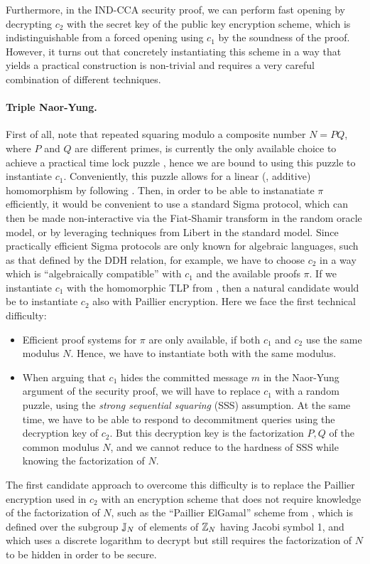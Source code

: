 Furthermore, in the IND-CCA security proof, we can perform fast opening by decrypting $c_2$ with the secret key of the public key encryption scheme, which is indistinguishable from a forced opening using $c_1$ by the soundness of the proof. 
%
However, it turns out that concretely instantiating this scheme in a way that yields a practical construction is non-trivial and requires a very careful combination of different techniques.

\paragraph{Triple Naor-Yung.}
First of all, note that repeated squaring modulo a composite number $N = PQ$, where $P$ and $Q$ are different primes, is currently the only available choice to achieve a practical time lock puzzle , hence we are bound to using this puzzle to instantiate $c_1$. Conveniently, this puzzle allows for a linear (\ie, additive) homomorphism by following \cite{C:MalThy19}.
%
Then, in order to be able to instanatiate $\pi$ efficiently, it would be convenient to use a standard Sigma protocol, which can then be made non-interactive via the Fiat-Shamir transform \cite{C:FiaSha86} in the random oracle model, or by leveraging techniques from Libert \etal \cite{Libert2021OneShotFN} in the standard model. Since practically efficient Sigma protocols are only known for algebraic languages, such as that defined by the DDH relation, for example, we have to choose $c_2$ in a way which is ``algebraically compatible'' with $c_1$ and the available proofs $\pi$. If we instantiate $c_1$ with the homomorphic TLP from \cite{C:MalThy19}, then a natural candidate would be to instantiate $c_2$ also with Paillier encryption.  Here we face the first technical difficulty: 
\begin{itemize}
	\item Efficient proof systems for $\pi$ are only available, if both $c_1$ and $c_2$ use the same modulus $N$. Hence, we have to instantiate both with the same modulus.
	\item When arguing that $c_1$ hides the committed message $m$ in the Naor-Yung argument of the security proof, we will have to replace $c_1$ with a random puzzle, using the \emph{strong sequential squaring} (SSS) assumption. At the same time, we have to be able to respond to decommitment queries using the decryption key of $c_2$. But this decryption key is the factorization $P, Q$ of the common modulus $N$, and we cannot reduce to the hardness of SSS while knowing the factorization of $N$.
\end{itemize}
The first candidate approach to overcome this difficulty is to replace the Paillier encryption used in $c_2$ with an encryption scheme that does not require knowledge of the factorization of $N$, such as the ``Paillier ElGamal'' scheme from , which is defined over the subgroup $\mathbb{J}_N$ of elements of $\mathbb{Z}_N$ having Jacobi symbol 1, and which uses a discrete logarithm to decrypt but still requires the factorization of $N$ to be hidden in order to be secure.

